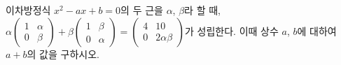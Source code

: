 \hspace*{2mm}\begin{minipage}[t]{\dimexpr\linewidth-2mm\relax}\vspace{0pt}
이차방정식 $x^2-ax+b=0$의 두 근을 $\alpha$, $\beta$라 할 때, $\alpha\begin{pmatrix} 1 & \alpha \\ 0 & \beta \end{pmatrix}+\beta\begin{pmatrix} 1 & \beta \\ 0 & \alpha \end{pmatrix}=\begin{pmatrix} 4 & 10 \\ 0 & 2\alpha\beta \end{pmatrix}$가 성립한다. 이때 상수 $a$, $b$에 대하여 $a+b$의 값을 구하시오.\end{minipage}
